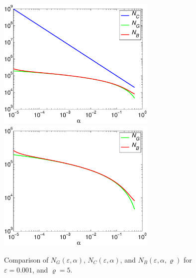 \documentclass[12pt]{amsart}
\begin{document}
\begin{figure}
\centering
\includegraphics[width=3in]{alphacompare.eps} \quad \includegraphics[width=3in]{alphacompareb.eps} \quad 
\caption{Comparison of $ N_G(\varepsilon,\alpha)$, $N_C(\varepsilon,\alpha)$, and $N_B(\varepsilon,\alpha,\varrho)$ for $\varepsilon = 0.001$, and $\varrho=5$. \label{alphacomparefig}}
\end{figure}
\end{document}
